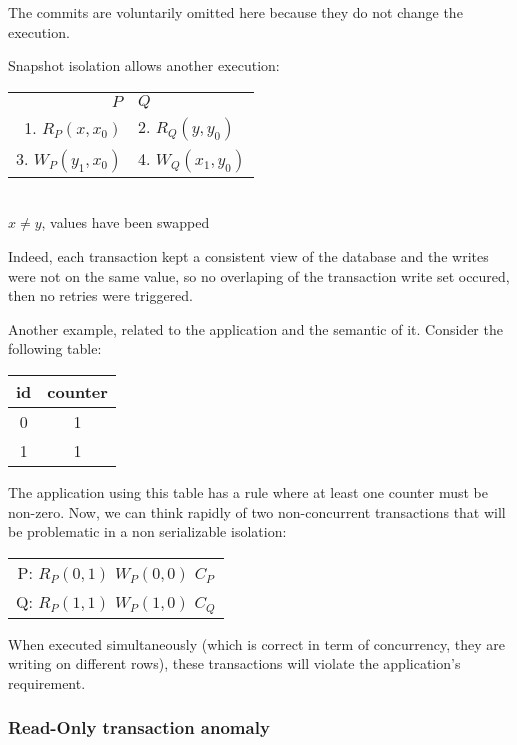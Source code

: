The commits are voluntarily omitted here because they do not change the execution.

Snapshot isolation allows another execution:

\begin{table}[H]
  \centering
  \begin{tabular}{ r  l }
    $P$ & $Q$ \\
    1. $R_P(x, x_0)$ & 2. $R_Q(y, y_0)$ \\
    3. $W_P(y_1, x_0)$ & 4. $W_Q(x_1, y_0)$ \\
  \end{tabular}
  \\
  $x \neq y$, values have been swapped
\end{table}

Indeed, each transaction kept a consistent view of the database and the writes were not on the same value, so no overlaping of the transaction write set occured, then no retries were triggered.

Another example, related to the application and the semantic of it. Consider the following table:

\begin{table}[H]
  \centering
  \begin{tabular}{ c | c }
    id & counter \\
        \hline
    0 & 1 \\
    1 & 1 \\
  \end{tabular}
\end{table}

The application using this table has a rule where at least one counter must be non-zero. Now, we can think rapidly of two non-concurrent transactions that will be problematic in a non serializable isolation:

\begin{table}[H]
  \centering
  \begin{tabular}{ c }
    P:   $R_P(0, 1)$ $W_P(0, 0)$ $C_P$ \\
    Q:   $R_P(1, 1)$ $W_P(1, 0)$ $C_Q$ \\
  \end{tabular}
\end{table}

When executed simultaneously (which is correct in term of concurrency, they are writing on different rows), these transactions will violate the application's requirement.

\subsubsection{Read-Only transaction anomaly}


